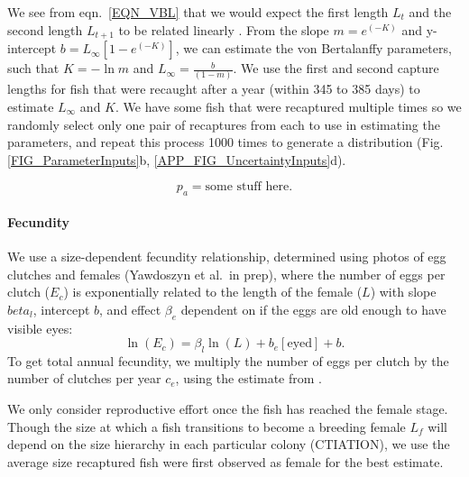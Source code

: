 \documentclass[12pt, oneside]{article}   	%
\begin{document}
We see from eqn.\ \ref{EQN_VBL} that we would expect the first length $L_t$ and the second length $L_{t+1}$ to be related linearly \citep{hart2009estimating}. From the slope $m = e^{(-K)}$ and y-intercept $b =  L_\infty[1 - e^{(-K)}]$, we can estimate the von Bertalanffy parameters, such that $K = -\ln m$ and $L_\infty = \frac{b}{(1-m)}$. We use the first and second capture lengths for fish that were recaught after a year (within 345 to 385 days) to estimate $L_\infty$ and $K$. We have some fish that were recaptured multiple times so we randomly select only one pair of recaptures from each to use in estimating the parameters, and repeat this process 1000 times to generate a distribution (Fig. \ref{FIG_ParameterInputs}b, \ref{APP_FIG_UncertaintyInputs}d).


\begin{equation} %
p_a = \text{some stuff here}. \label{EQN_Survival}
\end{equation}

\paragraph*{Fecundity}

We use a size-dependent fecundity relationship, determined using photos of egg clutches and females (Yawdoszyn et al.\ in prep), where the number of eggs per clutch ($E_c$) is exponentially related to the length of the female ($L$) with slope $beta_l$, intercept $b$, and effect $\beta_e$ dependent on if the eggs are old enough to have visible eyes: 
\begin{equation} %
\ln(E_c) = \beta_l\ln(L) + b_e[\text{eyed}] + b. \label{EQN_Fec}
\end{equation}
To get total annual fecundity, we multiply the number of eggs per clutch by the number of clutches per year $c_e$, using the estimate from \cite{holtswarth2017fecundity}.

We only consider reproductive effort once the fish has reached the female stage. Though the size at which a fish transitions to become a breeding female $L_f$ will depend on the size hierarchy in each particular colony (CTIATION), we use the average size recaptured fish were first observed as female for the best estimate. 

\end{document}
